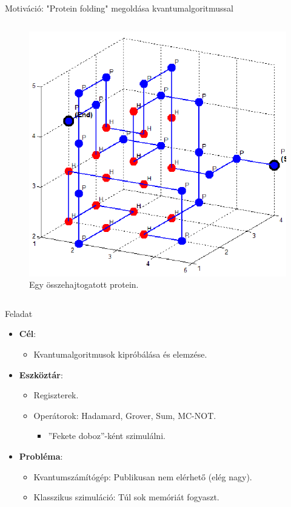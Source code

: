 \documentclass[aspectratio=169]{beamer}
\begin{document}
\begin{frame}{Motiváció: "Protein folding" megoldása kvantumalgoritmussal}
\begin{columns}
\begin{column}{0.45\textwidth}
\begin{figure}[H]
\center
\includegraphics[width=\textwidth]{./figures/Protein-folds-with-length-36-amino-acids-18-contacts.png}
\caption{Egy összehajtogatott protein.}
\end{figure}
\end{column}
\end{columns}

\end{frame}

\begin{frame}[t]{Feladat}

\begin{itemize}
    \item \textbf{Cél}:
    \begin{itemize}
      \item Kvantumalgoritmusok kipróbálása és elemzése.
    \end{itemize}
    \item \textbf{Eszköztár}:
    \begin{itemize}
      \item Regiszterek.
      \item Operátorok: Hadamard, Grover, Sum, MC-NOT.
      \begin{itemize}
        \item ''Fekete doboz''-ként szimulálni.
      \end{itemize}
    \end{itemize}
    \item \textbf{Probléma}:
    \begin{itemize}
      \item Kvantumszámítógép: Publikusan nem elérhető (elég nagy).
      \item Klasszikus szimuláció: Túl sok memóriát fogyaszt.
    \end{itemize}
\end{itemize}
\end{frame}
\end{document}

